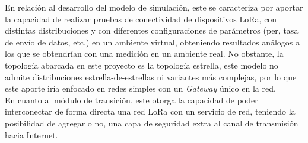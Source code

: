 \begin{justify}
\noindent
En relación al desarrollo del modelo de simulación, este se caracteriza por aportar la capacidad de realizar pruebas de conectividad de dispositivos LoRa, con distintas distribuciones y con diferentes configuraciones de parámetros (\gls{per}, tasa de envío de datos, etc.) en un ambiente virtual, obteniendo resultados análogos a los que se obtendrían con una medición en un ambiente real. No obstante, la topología abarcada en este proyecto es la topología estrella, este modelo no admite distribuciones estrella-de-estrellas ni variantes más complejas, por lo que este aporte iría enfocado en redes simples con un \textit{Gateway} único en la red.\\
En cuanto al módulo de transición, este otorga la capacidad de poder interconectar de forma directa una red LoRa con un servicio de red, teniendo la posibilidad de agregar o no, una capa de seguridad extra al canal de transmisión hacia Internet.
\end{justify}